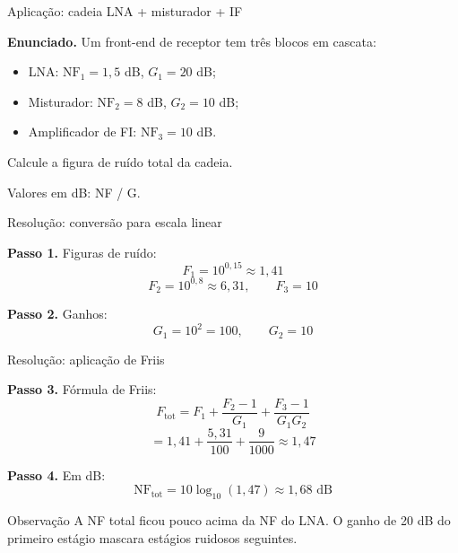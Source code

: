 
\begin{frame}{Aplicação: cadeia LNA + misturador + IF}

\textbf{Enunciado.} Um front-end de receptor tem três blocos em cascata:
\begin{itemize}
\item LNA: $\mathrm{NF}_1 = 1{,}5$ dB, $G_1 = 20$ dB;
\item Misturador: $\mathrm{NF}_2 = 8$ dB, $G_2 = 10$ dB;
\item Amplificador de FI: $\mathrm{NF}_3 = 10$ dB.
\end{itemize}
Calcule a figura de ruído total da cadeia.

\begin{center}
\end{center}
\centerline{\scriptsize Valores em dB: NF / G.}

\end{frame}


\begin{frame}{Resolução: conversão para escala linear}

\textbf{Passo 1.} Figuras de ruído:
\[
F_1 = 10^{0{,}15} \approx 1{,}41
\]
\[
F_2 = 10^{0{,}8} \approx 6{,}31, \qquad F_3 = 10
\]

\textbf{Passo 2.} Ganhos:
\[
G_1 = 10^{2} = 100, \qquad G_2 = 10
\]

\end{frame}


\begin{frame}{Resolução: aplicação de Friis}

\textbf{Passo 3.} Fórmula de Friis:
\[
F_{\text{tot}} = F_1 + \frac{F_2 - 1}{G_1} + \frac{F_3 - 1}{G_1 G_2}
\]
\[
= 1{,}41 + \frac{5{,}31}{100} + \frac{9}{1000} \approx 1{,}47
\]

\textbf{Passo 4.} Em dB:
\[
\mathrm{NF}_{\text{tot}} = 10\log_{10}(1{,}47) \approx 1{,}68 \text{ dB}
\]

\begin{block}{Observação}
A NF total ficou pouco acima da NF do LNA. O ganho de 20 dB do primeiro estágio mascara estágios ruidosos seguintes.
\end{block}

\end{frame}

